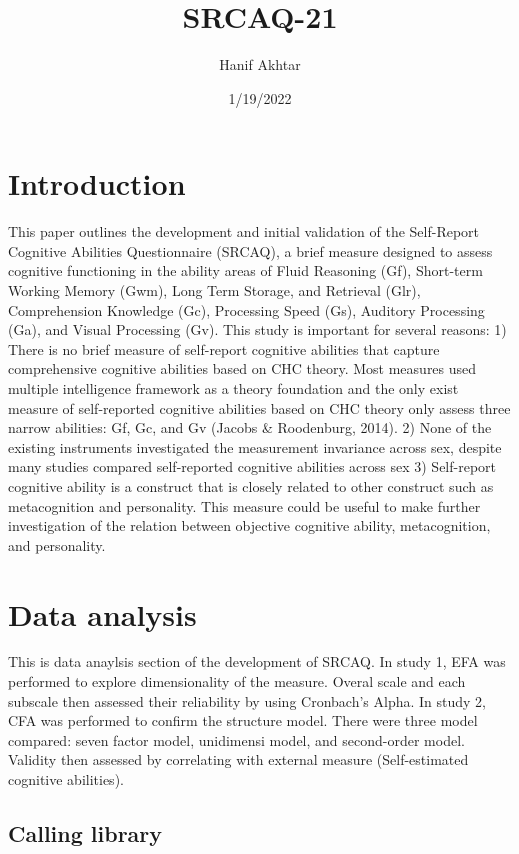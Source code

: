 \documentclass[
]{article}
\title{SRCAQ-21}
\author{Hanif Akhtar}
\date{1/19/2022}
\begin{document}
\maketitle

\hypertarget{introduction}{%
\section{Introduction}\label{introduction}}

This paper outlines the development and initial validation of the
Self-Report Cognitive Abilities Questionnaire (SRCAQ), a brief measure
designed to assess cognitive functioning in the ability areas of Fluid
Reasoning (Gf), Short-term Working Memory (Gwm), Long Term Storage, and
Retrieval (Glr), Comprehension Knowledge (Gc), Processing Speed (Gs),
Auditory Processing (Ga), and Visual Processing (Gv). This study is
important for several reasons: 1) There is no brief measure of
self-report cognitive abilities that capture comprehensive cognitive
abilities based on CHC theory. Most measures used multiple intelligence
framework as a theory foundation and the only exist measure of
self-reported cognitive abilities based on CHC theory only assess three
narrow abilities: Gf, Gc, and Gv (Jacobs \& Roodenburg, 2014). 2) None
of the existing instruments investigated the measurement invariance
across sex, despite many studies compared self-reported cognitive
abilities across sex 3) Self-report cognitive ability is a construct
that is closely related to other construct such as metacognition and
personality. This measure could be useful to make further investigation
of the relation between objective cognitive ability, metacognition, and
personality.

\hypertarget{data-analysis}{%
\section{Data analysis}\label{data-analysis}}

This is data anaylsis section of the development of SRCAQ. In study 1,
EFA was performed to explore dimensionality of the measure. Overal scale
and each subscale then assessed their reliability by using Cronbach's
Alpha. In study 2, CFA was performed to confirm the structure model.
There were three model compared: seven factor model, unidimensi model,
and second-order model. Validity then assessed by correlating with
external measure (Self-estimated cognitive abilities).

\hypertarget{calling-library}{%
\subsection{Calling library}\label{calling-library}}
\end{document}
